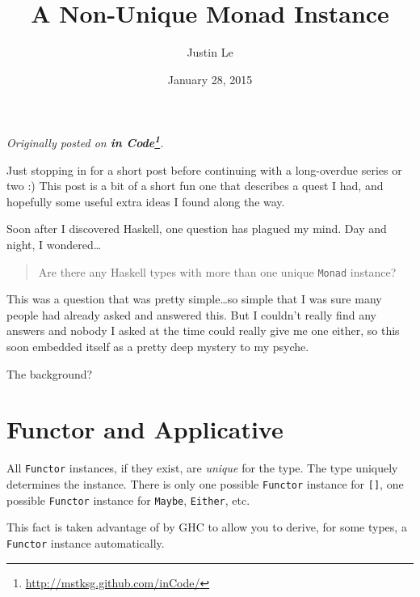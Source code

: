 \documentclass[]{article}
\title{A Non-Unique Monad Instance}
\author{Justin Le}
\date{January 28, 2015}
\renewcommand{\href}[2]{#2\footnote{\url{#1}}}
\begin{document}
\maketitle

\emph{Originally posted on
\textbf{\href{http://mstksg.github.com/inCode/}{in Code}}.}

Just stopping in for a short post before continuing with a long-overdue
series or two :) This post is a bit of a short fun one that describes a
quest I had, and hopefully some useful extra ideas I found along the
way.

Soon after I discovered Haskell, one question has plagued my mind. Day
and night, I wondered\ldots{}

\begin{quote}
Are there any Haskell types with more than one unique \texttt{Monad}
instance?
\end{quote}

This was a question that was pretty simple\ldots{}so simple that I was
sure many people had already asked and answered this. But I couldn't
really find any answers and nobody I asked at the time could really give
me one either, so this soon embedded itself as a pretty deep mystery to
my psyche.

The background?

\section{Functor and Applicative}\label{functor-and-applicative}

All \texttt{Functor} instances, if they exist, are \emph{unique} for the
type. The type uniquely determines the instance. There is only one
possible \texttt{Functor} instance for \texttt{{[}{]}}, one possible
\texttt{Functor} instance for \texttt{Maybe}, \texttt{Either}, etc.

This fact is taken advantage of by GHC to allow you to derive, for some
types, a \texttt{Functor} instance automatically.
\end{document}
